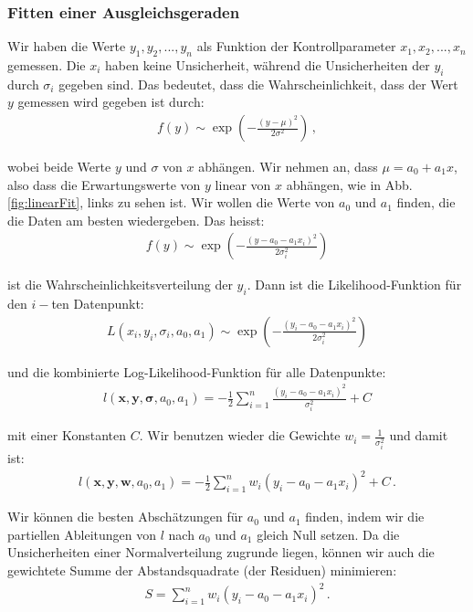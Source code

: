 \subsubsection{Fitten einer Ausgleichsgeraden}
\label{subsubsec:vl8}

Wir haben die Werte $y_1, y_2, ..., y_n$ als Funktion der Kontrollparameter $x_1, x_2, ..., x_n$ gemessen. Die $x_i$ haben keine Unsicherheit, w\"ahrend die Unsicherheiten der $y_i$ durch $\sigma_i$ gegeben sind. Das bedeutet, dass die Wahrscheinlichkeit, dass der Wert $y$ gemessen wird gegeben ist durch:
\begin{align}
f(y) \sim \exp \left( - \frac{ (y - \mu)^2 }{ 2 \sigma^2 } \right)\,,
\label{eq:vl8-19}
\end{align}

wobei beide Werte $y$ und $\sigma$ von $x$ abh\"angen. Wir nehmen an, dass $\mu = a_0 + a_1 x$, also dass die Erwartungswerte von $y$ linear von $x$ abh\"angen, wie in Abb. \ref{fig:linearFit}, links zu sehen ist. Wir wollen die Werte von $a_0$ und $a_1$ finden, die die Daten am besten wiedergeben. Das heisst:
\begin{align}
f(y) \sim \exp \left( - \frac{ (y - a_0 - a_1 x_i)^2 }{ 2 \sigma_i^2 } \right)
\label{eq:vl8-20}
\end{align}

ist die Wahrscheinlichkeitsverteilung der $y_i$. Dann ist die Likelihood-Funktion f\"ur den $i-$ten Datenpunkt:
\begin{align}
L(x_i, y_i, \sigma_i, a_0, a_1) \sim \exp \left( - \frac{ (y_i - a_0 - a_1 x_i)^2 }{ 2 \sigma_i^2 } \right)
\label{eq:vl8-21}
\end{align}

und die kombinierte Log-Likelihood-Funktion für alle Datenpunkte:
\begin{align}
l(\boldsymbol{x, y, \sigma}, a_0, a_1) = - \frac{1}{2} \sum_{i=1}^n \frac{ (y_i - a_0 - a_1 x_i)^2 }{ \sigma_i^2 } + C
\label{eq:vl8-22}
\end{align}

mit einer Konstanten $C$. Wir benutzen wieder die Gewichte $w_i= \frac{1}{\sigma_i^2}$ und damit ist:
\begin{align}
l(\boldsymbol{x, y, w}, a_0, a_1) = - \frac{1}{2} \sum_{i=1}^n w_i (y_i - a_0 - a_1 x_i)^2 + C\,.
\label{eq:vl8-23}
\end{align}

Wir k\"onnen die besten Absch\"atzungen f\"ur $a_0$ und $a_1$ finden, indem wir die partiellen Ableitungen von $l$ nach $a_0$ und $a_1$ gleich Null setzen. Da die Unsicherheiten einer Normalverteilung zugrunde liegen, k\"onnen wir auch die gewichtete Summe der Abstandsquadrate (der Residuen) minimieren:
\begin{align}
S  = \sum_{i=1}^n w_i (y_i - a_0 - a_1 x_i)^2\,.
\label{eq:vl8-24}
\end{align}

